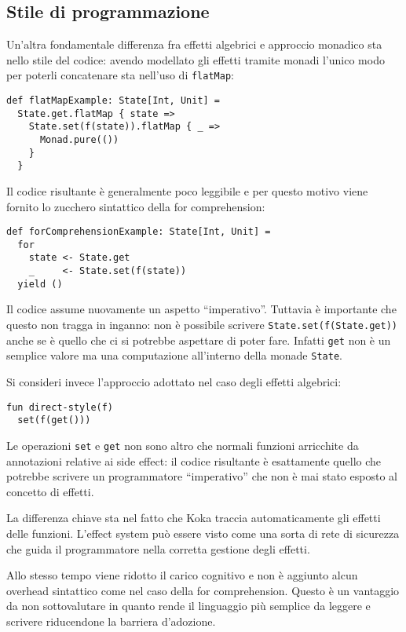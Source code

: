 \subsection{Stile di programmazione}
Un'altra fondamentale differenza fra effetti algebrici e approccio monadico sta nello stile del codice: avendo modellato gli effetti tramite monadi l'unico modo per poterli concatenare sta nell'uso di \lstinline{flatMap}:
\begin{lstlisting}[language=scala3]
def flatMapExample: State[Int, Unit] =
  State.get.flatMap { state =>
    State.set(f(state)).flatMap { _ => 
      Monad.pure(())
    }
  }
\end{lstlisting}
Il codice risultante è generalmente poco leggibile e per questo motivo viene fornito lo zucchero sintattico della for comprehension:
\begin{lstlisting}[language=scala3]
def forComprehensionExample: State[Int, Unit] =
  for
    state <- State.get
    _     <- State.set(f(state))
  yield ()
\end{lstlisting}
Il codice assume nuovamente un aspetto ``imperativo''. Tuttavia è importante che questo non tragga in inganno: non è possibile scrivere
\lstinline{State.set(f(State.get))} anche se è quello che ci si potrebbe aspettare di poter fare.
Infatti \lstinline{get} non è un semplice valore ma una computazione all'interno della monade \lstinline{State}.

Si consideri invece l'approccio adottato nel caso degli effetti algebrici:
\begin{lstlisting}[language=koka]
fun direct-style(f)
  set(f(get()))
\end{lstlisting}

Le operazioni \lstinline{set} e \lstinline{get} non sono altro che normali funzioni arricchite da annotazioni relative ai side effect: il codice risultante è esattamente quello che potrebbe scrivere un programmatore ``imperativo'' che non è mai stato esposto al concetto di effetti.

La differenza chiave sta nel fatto che Koka traccia automaticamente gli effetti delle funzioni. L'effect system può essere visto come una sorta di rete di sicurezza che guida il programmatore nella corretta gestione degli effetti.

Allo stesso tempo viene ridotto il carico cognitivo e non è aggiunto alcun overhead sintattico come nel caso della for comprehension.
Questo è un vantaggio da non sottovalutare in quanto rende il linguaggio più semplice da leggere e scrivere riducendone la barriera d'adozione.

